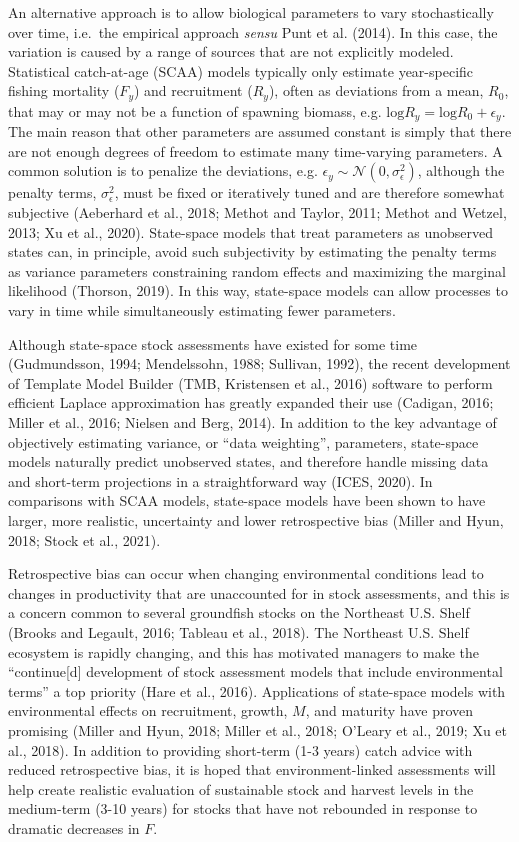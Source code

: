 \documentclass[]{article}
\begin{document}
An alternative approach is to allow biological parameters to vary
stochastically over time, i.e.~the empirical approach \emph{sensu} Punt
et al. (2014). In this case, the variation is caused by a range of
sources that are not explicitly modeled. Statistical catch-at-age (SCAA)
models typically only estimate year-specific fishing mortality (\(F_y\))
and recruitment (\(R_y\)), often as deviations from a mean, \(R_0\),
that may or may not be a function of spawning biomass, e.g.
\(\text{log}R_y = \text{log}R_0 + \epsilon_y\). The main reason that
other parameters are assumed constant is simply that there are not
enough degrees of freedom to estimate many time-varying parameters. A
common solution is to penalize the deviations, e.g.
\(\epsilon_y \sim \mathcal{N}(0,\sigma^2_\epsilon)\), although the
penalty terms, \(\sigma^2_\epsilon\), must be fixed or iteratively tuned
and are therefore somewhat subjective (Aeberhard et al., 2018; Methot
and Taylor, 2011; Methot and Wetzel, 2013; Xu et al., 2020). State-space
models that treat parameters as unobserved states can, in principle,
avoid such subjectivity by estimating the penalty terms as variance
parameters constraining random effects and maximizing the marginal
likelihood (Thorson, 2019). In this way, state-space models can allow
processes to vary in time while simultaneously estimating fewer
parameters.

Although state-space stock assessments have existed for some time
(Gudmundsson, 1994; Mendelssohn, 1988; Sullivan, 1992), the recent
development of Template Model Builder (TMB, Kristensen et al., 2016)
software to perform efficient Laplace approximation has greatly expanded
their use (Cadigan, 2016; Miller et al., 2016; Nielsen and Berg, 2014).
In addition to the key advantage of objectively estimating variance, or
``data weighting'', parameters, state-space models naturally predict
unobserved states, and therefore handle missing data and short-term
projections in a straightforward way (ICES, 2020). In comparisons with
SCAA models, state-space models have been shown to have larger, more
realistic, uncertainty and lower retrospective bias (Miller and Hyun,
2018; Stock et al., 2021).

Retrospective bias can occur when changing environmental conditions lead
to changes in productivity that are unaccounted for in stock
assessments, and this is a concern common to several groundfish stocks
on the Northeast U.S. Shelf (Brooks and Legault, 2016; Tableau et al.,
2018). The Northeast U.S. Shelf ecosystem is rapidly changing, and this
has motivated managers to make the ``continue{[}d{]} development of
stock assessment models that include environmental terms'' a top
priority (Hare et al., 2016). Applications of state-space models with
environmental effects on recruitment, growth, \(M\), and maturity have
proven promising (Miller and Hyun, 2018; Miller et al., 2018; O'Leary et
al., 2019; Xu et al., 2018). In addition to providing short-term (1-3
years) catch advice with reduced retrospective bias, it is hoped that
environment-linked assessments will help create realistic evaluation of
sustainable stock and harvest levels in the medium-term (3-10 years) for
stocks that have not rebounded in response to dramatic decreases in
\(F\).
\end{document}
